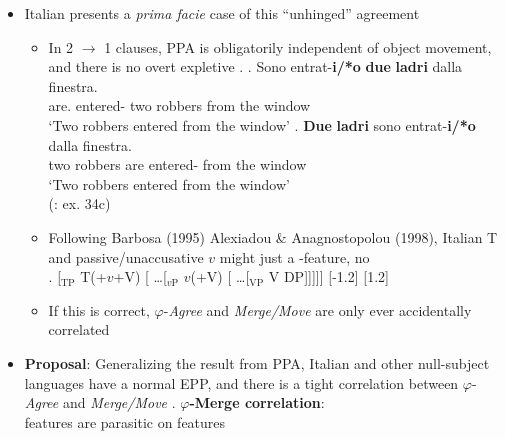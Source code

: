\documentclass[letterpaper,10pt]{handout_nick}
\begin{document}
\begin{itemize}
\item Italian presents a \emph{prima facie} case of this ``unhinged'' agreement
\begin{itemize}
\item In 2 $\rightarrow$ 1 clauses, PPA is obligatorily independent of object movement, and there is no overt expletive
\ex. 
\ag. Sono entrat-{\bf i/*o} {\bf due} {\bf ladri} dalla finestra.\\
are. entered- two robbers {from the} window\\
`Two robbers entered from the window'
\bg. {\bf Due} {\bf ladri} sono entrat-{\bf i/*o}  dalla finestra.\\
two robbers are entered- {from the} window\\
`Two robbers entered from the window'\\
(\citealt{belletti06}: ex. 34c)

\item Following Barbosa (1995) Alexiadou \& Anagnostopolou (1998), Italian T and passive/unaccusative $v$ might just a \fa{$\varphi$}-feature, no \fm{$\varphi$}\\
\ex. [$_\text{TP}$ \hspace*{-.2cm}T(+$v$+V) [ \ldots [$_\text{$v$P}$ \hspace*{-.2cm}$v$(+V) [ \ldots [$_\text{VP}$ V \hspace*{-.30cm}DP]]]]]
[-1.2]
[1.2]\\

\item If this is correct, $\varphi$-\emph{Agree} and \emph{Merge/Move} are only ever accidentally correlated
\end{itemize}
\item {\bf Proposal}: Generalizing the result from PPA, Italian and other null-subject languages have a normal EPP, and there is a tight correlation between $\varphi$-\emph{Agree} and \emph{Merge/Move}
\ex.\label{macor} {\bf $\varphi$-Merge correlation}:\\
\fa{$\varphi$} features are parasitic on \fm{$\varphi$} features

\end{itemize} 
\end{document}
